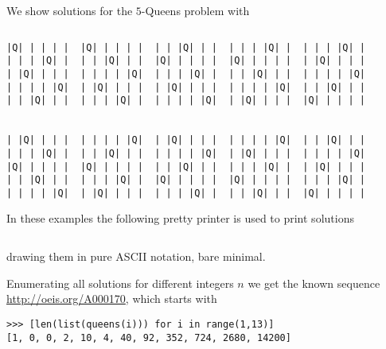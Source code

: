 
\begin{example}
We show solutions for the $5$-Queens problem with
\inputminted[baselinestretch=0.8]{python}{backtracking/5queens-enumeration-snippet.py}
\begin{Verbatim}[baselinestretch=0.1]
|Q| | | | |  |Q| | | | |  | | |Q| | |  | | | |Q| |  | | | |Q| |
| | | |Q| |  | | |Q| | |  |Q| | | | |  |Q| | | | |  | |Q| | | |
| |Q| | | |  | | | | |Q|  | | | |Q| |  | | |Q| | |  | | | | |Q|
| | | | |Q|  | |Q| | | |  | |Q| | | |  | | | | |Q|  | | |Q| | |
| | |Q| | |  | | | |Q| |  | | | | |Q|  | |Q| | | |  |Q| | | | |


| |Q| | | |  | | | | |Q|  | |Q| | | |  | | | | |Q|  | | |Q| | |
| | | |Q| |  | | |Q| | |  | | | | |Q|  | |Q| | | |  | | | | |Q|
|Q| | | | |  |Q| | | | |  | | |Q| | |  | | | |Q| |  | |Q| | | |
| | |Q| | |  | | | |Q| |  |Q| | | | |  |Q| | | | |  | | | |Q| |
| | | | |Q|  | |Q| | | |  | | | |Q| |  | | |Q| | |  |Q| | | | |
\end{Verbatim}
\end{example}

In these examples the following pretty printer is used to print solutions
\inputminted[baselinestretch=0.8,firstline=30, lastline=39]
    {python}{backtracking/queens.py}
\noindent drawing them in pure ASCII notation, bare minimal.

Enumerating all solutions for different integers $n$ we get the known sequence
\url{http://oeis.org/A000170}, which starts with
\begin{verbatim}
>>> [len(list(queens(i))) for i in range(1,13)]
[1, 0, 0, 2, 10, 4, 40, 92, 352, 724, 2680, 14200]
\end{verbatim}

